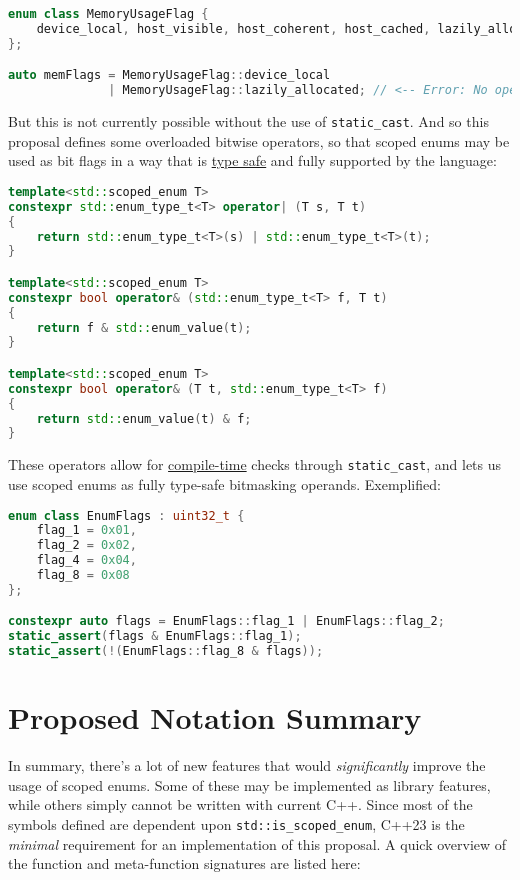 \documentclass[
  format=manuscript,
  screen=true,
  review=false,
  nonacm=true,
  timestamp=true,
  balance=false]{acmart}
\begin{document}
\begin{lstlisting}[language=Cpp]
enum class MemoryUsageFlag {
    device_local, host_visible, host_coherent, host_cached, lazily_allocated, is_protected
};

auto memFlags = MemoryUsageFlag::device_local
              | MemoryUsageFlag::lazily_allocated; // <-- Error: No operator defined.
\end{lstlisting}

\noindent
But this is not currently possible without the use of \texttt{static\_cast}. And so
this proposal defines some overloaded bitwise operators, so that scoped enums may be
used as bit flags in a way that is \underline{type safe} and fully supported by the
language:\vspace{2mm}

\begin{lstlisting}[language=Cpp]
template<std::scoped_enum T>
constexpr std::enum_type_t<T> operator| (T s, T t)
{
    return std::enum_type_t<T>(s) | std::enum_type_t<T>(t);
}

template<std::scoped_enum T>
constexpr bool operator& (std::enum_type_t<T> f, T t)
{
    return f & std::enum_value(t);
}

template<std::scoped_enum T>
constexpr bool operator& (T t, std::enum_type_t<T> f)
{
    return std::enum_value(t) & f;
}
\end{lstlisting}

\noindent
These operators allow for \underline{compile-time} checks through \texttt{static\_cast},
and lets us use scoped enums as fully type-safe bitmasking operands. Exemplified:\vspace{2mm}

\begin{lstlisting}[language=Cpp]
enum class EnumFlags : uint32_t {
    flag_1 = 0x01,
    flag_2 = 0x02,
    flag_4 = 0x04,
    flag_8 = 0x08
};

constexpr auto flags = EnumFlags::flag_1 | EnumFlags::flag_2;
static_assert(flags & EnumFlags::flag_1);
static_assert(!(EnumFlags::flag_8 & flags));
\end{lstlisting}



\section{Proposed Notation Summary}

In summary, there's a lot of new features that would \textit{significantly} improve
the usage of scoped enums. Some of these may be implemented as library features,
while others simply cannot be written with current C++. Since most of the symbols
defined are dependent upon \texttt{std::is\_scoped\_enum}, C++23 is the
\textit{minimal} requirement for an implementation of this proposal. A quick overview
of the function and meta-function signatures are listed here:\vspace{2mm}
\end{document}
